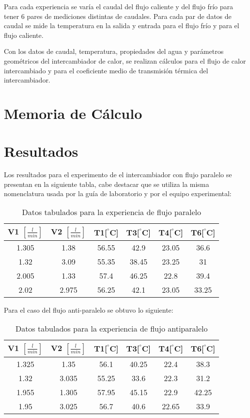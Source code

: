 \documentclass[letterpaper,11pt]{article} %
\begin{document}
Para cada experiencia se varía el caudal del flujo caliente y del flujo frío para tener 6 pares de mediciones distintas de caudales. Para cada par de datos de caudal se mide la temperatura en la salida y entrada para el flujo frío y para el flujo caliente.

Con los datos de caudal, temperatura, propiedades del agua y parámetros geométricos del intercambiador de calor, se realizan cálculos para el flujo de calor intercambiado y para el coeficiente medio de transmisión térmica del intercambiador. 

\newpage
\section{Memoria de Cálculo}


\newpage
\section{Resultados}
Los resultados para el experimento de el intercambiador con flujo paralelo se presentan en la siguiente tabla, cabe destacar que se utiliza la misma nomenclatura usada por la guía de laboratorio y por el equipo experimental:
\newp
\begin{table}[htbp]
    \centering
    
    \caption{Datos tabulados para la experiencia de flujo paralelo}
    \begin{tabular}{c|c|c|c|c|c}
    V1 $[\frac{l}{min}]$ & V2 $[\frac{l}{min}]$ &T1[$^{°}$C]& T3[$^{°}$C]&T4[$^{°}$C]&T6[$^{°}$C]\\
        \hline
        1.305 & 1.38 & 56.55 &42.9 &23.05 &36.6\\
        1.32 & 3.09 & 55.35 &38.45 &23.25 &31\\
        2.005 & 1.33 & 57.4 &46.25 &22.8 &39.4\\
        2.02 & 2.975 & 56.25 &42.1 &23.05 &33.25\\
    \end{tabular}
    \label{tab:paralelo}
\end{table}
\newp
Para el caso del flujo anti-paralelo se obtuvo lo siguiente:
\begin{table}[htbp]
    \centering
    \caption{Datos tabulados para la experiencia de flujo antiparalelo}
    \begin{tabular}{c|c|c|c|c|c}
    
        V1 $[\frac{l}{min}]$ & V2 $[\frac{l}{min}]$ &T1[$^{°}$C]& T3[$^{°}$C]&T4[$^{°}$C]&T6[$^{°}$C]\\
        \hline
        1.325 & 1.35 & 56.1 &40.25 &22.4 &38.3\\
        1.32 & 3.035 & 55.25 &33.6 &22.3 &31.2\\
        1.955 & 1.305 & 57.95 &45.15 &22.9 &42.25\\
        1.95 & 3.025 & 56.7 &40.6 &22.65 &33.9\\
    \end{tabular}
    \label{tab:antiparalelo}
\end{table}
\end{document}
